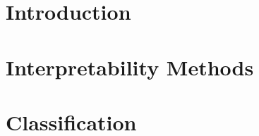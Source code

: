 \chapter{Introduction}


\chapter{Interpretability Methods}








\chapter{Classification}







% 
% 
% 
% 
% 
% 
% 

% 

% 

% 
% 
% 
% 
% 
% 
% 
% 
% 
% 

